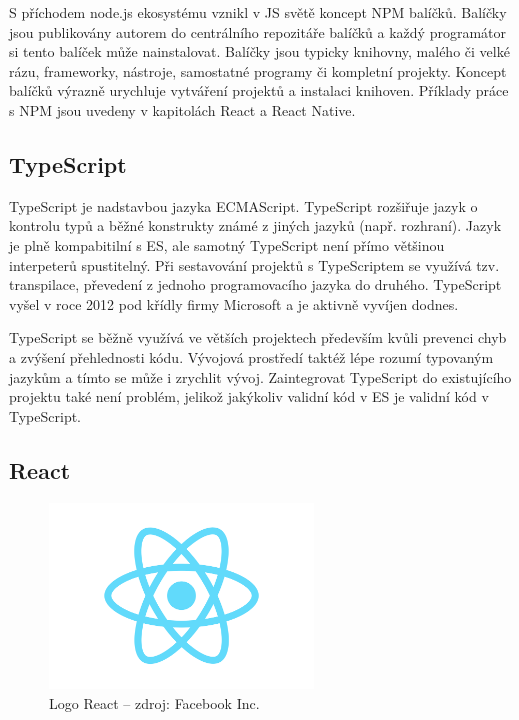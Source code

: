 S příchodem node.js ekosystému vznikl v JS světě koncept NPM balíčků. Balíčky jsou publikovány autorem do centrálního repozitáře balíčků a každý programátor si tento balíček může nainstalovat. Balíčky jsou typicky knihovny, malého či velké rázu, frameworky, nástroje, samostatné programy či kompletní projekty. Koncept balíčků výrazně urychluje vytváření projektů a instalaci knihoven. Příklady práce s NPM jsou uvedeny v kapitolách React a React Native.

\subsection{TypeScript}

TypeScript je nadstavbou jazyka ECMAScript. TypeScript rozšiřuje jazyk o kontrolu typů a běžné konstrukty známé z jiných jazyků (např. rozhraní). Jazyk je plně kompabitilní s ES, ale samotný TypeScript není přímo většinou interpeterů spustitelný. Při sestavování projektů s TypeScriptem se využívá tzv. transpilace, převedení z jednoho programovacího jazyka do druhého. TypeScript vyšel v roce 2012 pod křídly firmy Microsoft a je aktivně vyvíjen dodnes.

TypeScript se běžně využívá ve větších projektech především kvůli prevenci chyb a zvýšení přehlednosti kódu. Vývojová prostředí taktéž lépe rozumí typovaným jazykům a tímto se může i zrychlit vývoj. Zaintegrovat TypeScript do existujícího projektu také není problém, jelikož jakýkoliv validní kód v ES je validní kód v TypeScript.

\subsection{React}

\begin{figure}
	\begin{center}
		\includegraphics[width=70mm]{img/react-logo.png}
	\end{center}
	\caption{Logo React -- zdroj: Facebook Inc.}
\end{figure}

